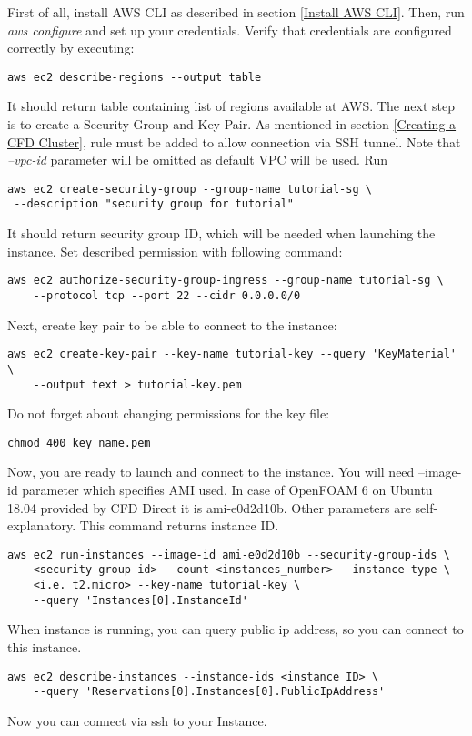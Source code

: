 \documentclass[11pt,english]{article}
\begin{document}
First of all, install AWS CLI as described in section \ref{Install AWS CLI}. Then, run \textit{aws configure} and set up your credentials.
Verify that credentials are configured correctly by executing:
\begin{lstlisting}
aws ec2 describe-regions --output table
\end{lstlisting}
It should return table containing list of regions available at AWS.
The next step is to create a Security Group and Key Pair. As mentioned in section \ref{Creating a CFD Cluster}, rule must be added to allow connection via SSH tunnel. Note that \textit{--vpc-id} parameter will be omitted as default VPC will be used. Run
\begin{lstlisting}
aws ec2 create-security-group --group-name tutorial-sg \
 --description "security group for tutorial"
\end{lstlisting}
It should return security group ID, which will be needed when launching the instance. Set described permission with following command:
\begin{lstlisting}
aws ec2 authorize-security-group-ingress --group-name tutorial-sg \
	--protocol tcp --port 22 --cidr 0.0.0.0/0
\end{lstlisting}
Next, create key pair to be able to connect to the instance:
\begin{lstlisting}
aws ec2 create-key-pair --key-name tutorial-key --query 'KeyMaterial' \
	--output text > tutorial-key.pem
\end{lstlisting}
Do not forget about changing permissions for the key file:
\begin{lstlisting}
chmod 400 key_name.pem
\end{lstlisting}
Now, you are ready to launch and connect to the instance. You will need --image-id parameter which specifies AMI used. In case of OpenFOAM 6 on Ubuntu 18.04 provided by CFD Direct it is ami-e0d2d10b. Other parameters are self-explanatory. This command returns instance ID.
\begin{lstlisting}
aws ec2 run-instances --image-id ami-e0d2d10b --security-group-ids \
	<security-group-id> --count <instances_number> --instance-type \
	<i.e. t2.micro>	--key-name tutorial-key \
	--query 'Instances[0].InstanceId'
\end{lstlisting}
When instance is running, you can query public ip address, so you can connect to this instance.
\begin{lstlisting}
aws ec2 describe-instances --instance-ids <instance ID> \
	--query 'Reservations[0].Instances[0].PublicIpAddress'
\end{lstlisting}
Now you can connect via ssh to your Instance.
\end{document}
